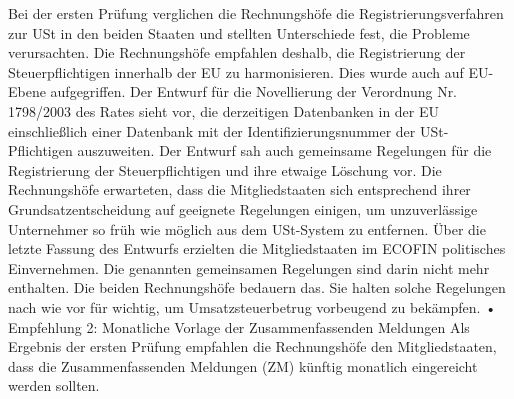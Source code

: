 \documentclass[10pt]{article}
\begin{document}
Bei der ersten Prüfung verglichen die Rechnungshöfe die Registrierungsverfahren zur USt in den beiden Staaten und stellten Unterschiede fest, die Probleme verursachten.
Die Rechnungshöfe empfahlen deshalb, die Registrierung der Steuerpflichtigen innerhalb der EU zu harmonisieren.
Dies wurde auch auf EU-Ebene aufgegriffen.
Der Entwurf für die Novellierung der Verordnung Nr. 1798/2003 des Rates sieht vor, die derzeitigen Datenbanken in der EU einschließlich einer Datenbank mit der Identifizierungsnummer der USt-Pflichtigen auszuweiten.
Der Entwurf sah auch gemeinsame Regelungen für die Registrierung der Steuerpflichtigen und ihre etwaige Löschung vor.
Die Rechnungshöfe erwarteten, dass die Mitgliedstaaten sich entsprechend ihrer Grundsatzentscheidung auf geeignete Regelungen einigen, um unzuverlässige Unternehmer so früh wie möglich aus dem USt-System zu entfernen.
Über die letzte Fassung des Entwurfs erzielten die Mitgliedstaaten im ECOFIN politisches Einvernehmen.
Die genannten gemeinsamen Regelungen sind darin nicht mehr enthalten. Die beiden Rechnungshöfe bedauern das.
Sie halten solche Regelungen nach wie vor für wichtig, um Umsatzsteuerbetrug vorbeugend zu bekämpfen.
• Empfehlung 2: Monatliche Vorlage der Zusammenfassenden Meldungen Als Ergebnis der ersten Prüfung empfahlen die Rechnungshöfe den Mitgliedstaaten, dass die Zusammenfassenden Meldungen (ZM) künftig monatlich eingereicht werden sollten.
\end{document}
